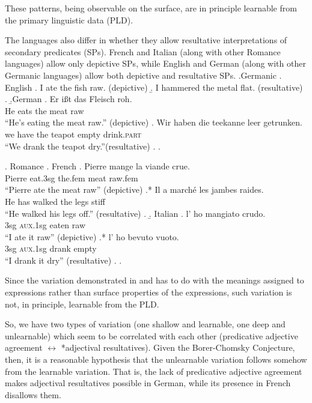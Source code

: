 \documentclass[letterpaper,12pt]{article}
\begin{document}
These patterns, being observable on the surface, are in principle learnable from the primary linguistic data (PLD).

The languages also differ in whether they allow resultative interpretations of secondary predicates (SPs).
French and Italian (along with other Romance languages) allow only depictive SPs, while English and German (along with other Germanic languages) allow both depictive and resultative SPs.
\ex.Germanic
\a. English
\a. I ate the fish raw. (depictive)
\b. I hammered the metal flat. (resultative)
\z.
\b.German 
\ag. Er i\ss{}t das Fleisch roh. \parencite{muller2004analysis}\\
He eats the meat raw { }\\
``He's eating the meat raw.'' (depictive)
\bg. Wir haben die teekanne leer getrunken. \parencite{kratzer_building_2004}\\
we have the teapot empty drink.\textsc{part} { }\\
``We drank the teapot dry.''(resultative)
\z.
\z.

\ex. Romance
\a. French
\ag. Pierre mange la viande crue. \parencite{legendre1997secondary}\\
Pierre eat.3sg the.fem meat raw.fem { }\\
``Pierre ate the meat raw'' (depictive)
\bg.* Il a march\'e les jambes raides. \parencite{washio1997resultatives}\\
He has walked the legs stiff { }\\
``He walked his legs off.'' (resultative)
\z.
\b. Italian
\ag. l' ho mangiato crudo.\\
3sg \textsc{aux}.1sg eaten raw\\
``I ate it raw'' (depictive)
\bg.* l' ho bevuto vuoto.\\
3sg \textsc{aux}.1sg drank empty\\
``I drank it dry'' (resultative)
\z.
\z.

Since the variation demonstrated in \LLast and \Last has to do with the meanings assigned to expressions rather than surface properties of the expressions, such variation is not, in principle, learnable from the PLD.

So, we have two types of variation (one shallow and learnable, one deep and unlearnable) which seem to be correlated with each other (predicative adjective agreement $\leftrightarrow$ *adjectival resultatives).
Given the Borer-Chomsky Conjecture, then, it is a reasonable hypothesis that the unlearnable variation follows somehow from the learnable variation.
That is, the lack of predicative adjective agreement makes adjectival resultatives possible in German, while its presence in French disallows them.
\end{document}
